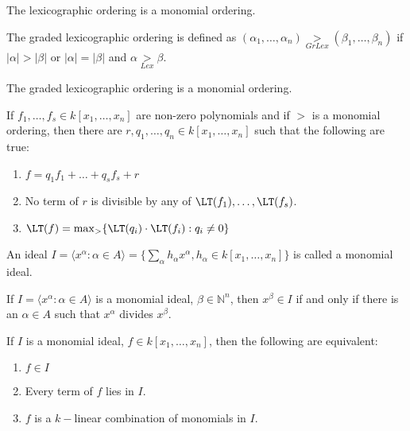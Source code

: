 \documentclass[crop=false,class=article,oneside]{standalone}
\begin{document}
        \begin{theorem}
            The lexicographic ordering is a monomial ordering.
        \end{theorem}
        \begin{definition}
            The graded lexicographic ordering is defined as
            $(\alpha_1,\hdots,\alpha_n)\underset{GrLex}{>}%
             (\beta_1,\hdots, \beta_n)$
            if $|\alpha|>|\beta|$ or $|\alpha|=|\beta|$
            and $\alpha\underset{Lex}{>}\beta$.
        \end{definition}
        \begin{theorem}
            The graded lexicographic ordering is a monomial ordering.
        \end{theorem}
        \begin{theorem}
            If $f_1,\hdots, f_s\in k[x_1,\hdots ,x_n]$ are
            non-zero polynomials and if $>$ is a monomial ordering,
            then there are $r,q_1,\hdots, q_n\in k[x_1,\hdots ,x_n]$
            such that the following are true:
            \begin{enumerate}
                \item $f=q_{1}f_{1}+\hdots+q_{s}f_{s}+r$
                \item No term of $r$ is divisible by
                      any of $\LT(f_{1}),\hdots,\LT(f_{s})$.
                \item $\LT(f)=\max_{>}\{\LT(q_{i})%
                       \cdot\LT(f_i):q_i\ne{0}\}$
            \end{enumerate}
        \end{theorem}
        \begin{definition}
            An ideal
            $I=\langle{x}^{\alpha}:\alpha\in{A}\rangle%
              =\{\sum_{\alpha}h_{\alpha}x^\alpha,h_{\alpha}%
               \in k[x_1,\hdots ,x_n]\}$
            is called a monomial ideal.
        \end{definition}
        \begin{theorem}
            If $I=\langle{x}^\alpha:\alpha\in{A}\rangle$
            is a monomial ideal,
            $\beta\in\mathbb{N}^n$, then $x^\beta\in{I}$
            if and only if there is an $\alpha\in{A}$
            such that $x^{\alpha}$ divides $x^{\beta}$.
        \end{theorem}
        \begin{theorem}
            If $I$ is a monomial ideal,
            $f\in{k}[x_1,\hdots ,x_n]$,
            then the following are equivalent:
            \begin{enumerate}
                \item $f\in I$
                \item Every term of $f$ lies in $I$.
                \item $f$ is a $k-$linear combination of
                      monomials in $I$.
            \end{enumerate}
        \end{theorem}
\end{document}
